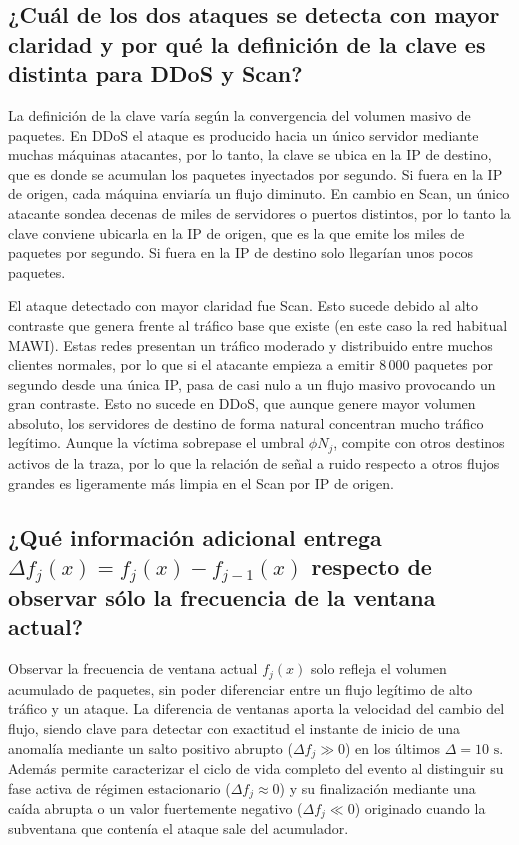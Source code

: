 \documentclass[10pt,a4paper]{article}
\begin{document}
\subsection{¿Cuál de los dos ataques se detecta con mayor claridad y por qué la definición de la
clave es distinta para DDoS y Scan?}

La definición de la clave varía según la convergencia del volumen masivo de paquetes. En DDoS el ataque es producido hacia un único servidor mediante muchas máquinas atacantes, por lo tanto, la clave se ubica en la IP de destino, que es donde se acumulan los paquetes inyectados por segundo. Si fuera en la IP de origen, cada máquina enviaría un flujo diminuto. En cambio en Scan, un único atacante sondea decenas de miles de servidores o puertos distintos, por lo tanto la clave conviene ubicarla en la IP de origen, que es la que emite los miles de paquetes por segundo. Si fuera en la IP de destino solo llegarían unos pocos paquetes.



El ataque detectado con mayor claridad fue Scan. Esto sucede debido al alto contraste que genera frente al tráfico base que existe (en este caso la red habitual MAWI). Estas redes presentan un tráfico moderado y distribuido entre muchos clientes normales, por lo que si el atacante empieza a emitir 8\,000 paquetes por segundo desde una única IP, pasa de casi nulo a un flujo masivo provocando un gran contraste. Esto no sucede en DDoS, que aunque genere mayor volumen absoluto, los servidores de destino de forma natural concentran mucho tráfico legítimo. Aunque la víctima sobrepase el umbral $\phi N_j$, compite con otros destinos activos de la traza, por lo que la relación de señal a ruido respecto a otros flujos grandes es ligeramente más limpia en el Scan por IP de origen.

\subsection{¿Qué información adicional entrega $\Delta f_j(x) = f_j(x) - f_{j-1}(x)$ respecto de observar sólo
la frecuencia de la ventana actual?}

Observar la frecuencia de ventana actual $f_j(x)$ solo refleja el volumen acumulado de paquetes, sin poder diferenciar entre un flujo legítimo de alto tráfico y un ataque. La diferencia de ventanas aporta la velocidad del cambio del flujo, siendo clave para detectar con exactitud el instante de inicio de una anomalía mediante un salto positivo abrupto ($\Delta f_j \gg 0$) en los últimos $\Delta = 10\text{ s}$. Además permite caracterizar el ciclo de vida completo del evento al distinguir su fase activa de régimen estacionario ($\Delta f_j \approx 0$) y su finalización mediante una caída abrupta o un valor fuertemente negativo ($\Delta f_j \ll 0$) originado cuando la subventana que contenía el ataque sale del acumulador.
\end{document}
